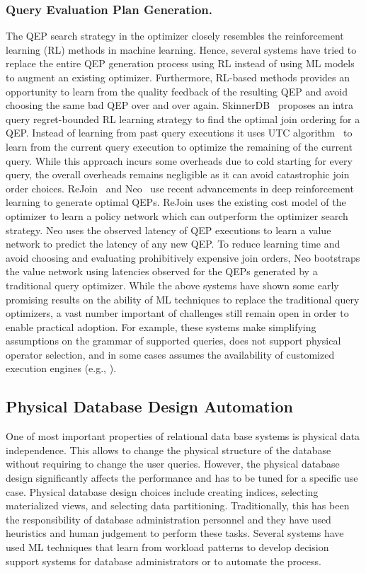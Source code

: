 \subsubsection{Query Evaluation Plan Generation.} The QEP search strategy in the optimizer closely resembles the reinforcement learning (RL) methods in machine learning.
Hence, several systems have tried to replace the entire QEP generation process using RL instead of using ML models to augment an existing optimizer.
Furthermore, RL-based methods provides an opportunity to learn from the quality feedback of the resulting QEP and avoid choosing the same bad QEP over and over again.
SkinnerDB~\cite{skinnerdb} proposes an intra query regret-bounded RL learning strategy to find the optimal join ordering for a QEP.
Instead of learning from past query executions it uses UTC algorithm~\cite{utc} to learn from the current query execution to optimize the remaining of the current query.
While this approach incurs some overheads due to cold starting for every query, the overall overheads remains negligible as it can avoid catastrophic join order choices.
ReJoin~\cite{rejoin} and Neo~\cite{neo} use recent advancements in deep reinforcement learning to generate optimal QEPs.
ReJoin uses the existing cost model of the optimizer to learn a policy network which can outperform the optimizer search strategy.
Neo uses the observed latency of QEP executions to learn a value network to predict the latency of any new QEP.
To reduce learning time and avoid choosing and evaluating prohibitively expensive join orders, Neo bootstraps the value network using latencies observed for the QEPs generated by a traditional query optimizer.
While the above systems have shown some early promising results on the ability of ML techniques to replace the traditional query optimizers, a vast number important of challenges still remain open in order to enable practical adoption.
For example, these systems make simplifying assumptions on the grammar of supported queries, does not support physical operator selection, and in some cases assumes the availability of customized execution engines (e.g., \cite{skinnerdb}).


\subsection{Physical Database Design Automation}
One of most important properties of relational data base systems is physical data independence.
This allows to change the physical structure of the database without requiring to change the user queries.
However, the physical database design significantly affects the performance and has to be tuned for a specific use case.
Physical database design choices include creating indices, selecting materialized views, and selecting data partitioning.
Traditionally, this has been the responsibility of database administration personnel and they have used heuristics and human judgement to perform these tasks.
Several systems have used ML techniques that learn from workload patterns to develop decision support systems for database administrators or to automate the process.

